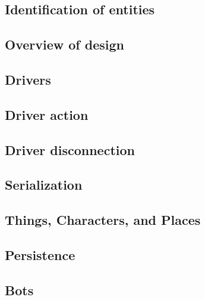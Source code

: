 \subsection{Identification of entities}
\label{impl:ids}


\subsection{Overview of design}
\label{impl:overview}


\subsection{Drivers}
\label{sec:impl:drivers}


\subsection{Driver action}
\label{sec:impl:driver-action}


\subsection{Driver disconnection}
\label{sec:impl:driver-disconnection}


\subsection{Serialization}
\label{sec:impl:serialization}


\subsection{Things, Characters, and Places}
\label{sec:impl:objects}


\subsection{Persistence}
\label{sec:impl:persistence}


\subsection{Bots}
\label{sec:impl:bots}


